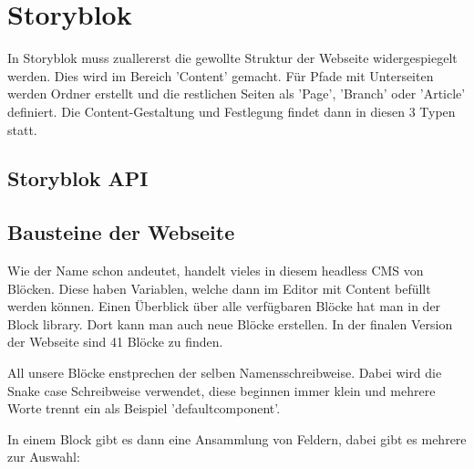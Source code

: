 

\section{Storyblok}

In Storyblok muss zuallererst die gewollte Struktur der Webseite widergespiegelt werden. Dies wird im Bereich 'Content' gemacht. 
Für Pfade mit Unterseiten werden Ordner erstellt und die restlichen Seiten  als 'Page', 'Branch' oder 'Article' definiert.
Die Content-Gestaltung und Festlegung findet dann in diesen 3 Typen statt. 


\subsection{Storyblok API}

\subsection{Bausteine der Webseite}
Wie der Name schon andeutet, handelt vieles in diesem headless CMS von Blöcken. Diese haben Variablen, welche dann im Editor mit Content befüllt werden können. 
Einen Überblick über alle verfügbaren Blöcke hat man in der Block library. Dort kann man auch neue Blöcke erstellen. In der finalen Version der Webseite sind 41 Blöcke zu finden. 

All unsere Blöcke enstprechen der selben Namensschreibweise. Dabei wird die Snake case Schreibweise verwendet, diese beginnen immer klein und mehrere Worte trennt ein \textunderscore  als Beispiel 'default\textunderscore component'.

In einem Block gibt es dann eine Ansammlung von Feldern, dabei gibt es mehrere zur Auswahl:

